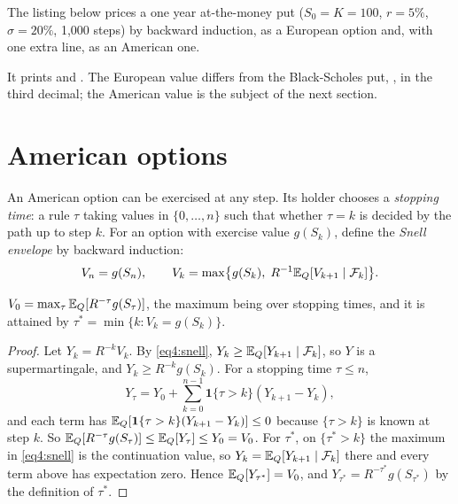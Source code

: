 \begin{chapterrefs}
The listing below prices a one year at-the-money put ($S_0=K=100$, $r=5\%$, $\sigma=20\%$, 1,000
steps) by backward induction, as a European option and, with one extra line, as an American one.

It prints \snipEu{} and \snipAm. The European value differs from the Black-Scholes put, \bsPut, in the
third decimal; the American value is the subject of the next section.

\section{American options}
\label{sec4:american}

An American option can be exercised at any step. Its holder chooses a \emph{stopping time}: a rule
$\tau$ taking values in $\{0,\dots,n\}$ such that whether $\tau=k$ is decided by the path up to step
$k$. For an option with exercise value $g(S_k)$, define the \emph{Snell envelope} by backward
induction:
\begin{equation}\label{eq4:snell}
  V_n=g(S_n),\qquad V_k=\max\bigl\{g(S_k),\;R^{-1}\mathbb{E}_Q[V_{k+1}\mid\mathcal F_k]\bigr\}.
\end{equation}

\begin{theorem}\label{thm4:snell}
$V_0=\max_\tau\mathbb{E}_Q[R^{-\tau}g(S_\tau)]$, the maximum being over stopping times, and it is attained by
$\tau^*=\min\{k:V_k=g(S_k)\}$.
\end{theorem}

\begin{proof}
Let $Y_k=R^{-k}V_k$. By \cref{eq4:snell}, $Y_k\ge\mathbb{E}_Q[Y_{k+1}\mid\mathcal F_k]$, so $Y$ is a
supermartingale, and $Y_k\ge R^{-k}g(S_k)$. For a stopping time $\tau\le n$,
\begin{equation*}
  Y_{\tau}=Y_0+\sum_{k=0}^{n-1}\mathbf 1\{\tau>k\}(Y_{k+1}-Y_k),
\end{equation*}
and each term has $\mathbb{E}_Q[\mathbf 1\{\tau>k\}(Y_{k+1}-Y_k)]\le0$ because $\{\tau>k\}$ is known at step
$k$. So $\mathbb{E}_Q[R^{-\tau}g(S_\tau)]\le\mathbb{E}_Q[Y_\tau]\le Y_0=V_0$. For $\tau^*$, on $\{\tau^*>k\}$ the
maximum in \cref{eq4:snell} is the continuation value, so $Y_k=\mathbb{E}_Q[Y_{k+1}\mid\mathcal F_k]$ there
and every term above has expectation zero. Hence $\mathbb{E}_Q[Y_{\tau^*}]=V_0$, and $Y_{\tau^*}=R^{-\tau^*}g(S_{\tau^*})$
by the definition of $\tau^*$.
\end{proof}


\end{chapterrefs}
